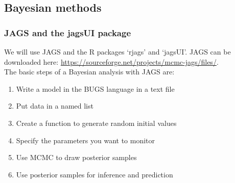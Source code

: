 \documentclass[color=usenames,dvipsnames]{beamer}\usepackage[]{graphicx}\usepackage[]{color}
\begin{document}



\subsection{Bayesian methods}




\begin{frame}
  \frametitle{JAGS and the jagsUI package}
  We will use JAGS and the R packages `rjags' and `jagsUI'. JAGS can
  be downloaded here: \url{https://sourceforge.net/projects/mcmc-jags/files/}. \\
  \pause
  \vfill
  The basic steps of a Bayesian analysis with JAGS are:
  \begin{enumerate}%
    \item Write a model in the BUGS language in a text file
    \item Put data in a named list
    \item Create a function to generate random initial values
    \item Specify the parameters you want to monitor
    \item Use MCMC to draw posterior samples
    \item Use posterior samples for inference and prediction
  \end{enumerate}
\end{frame}
\end{document}
